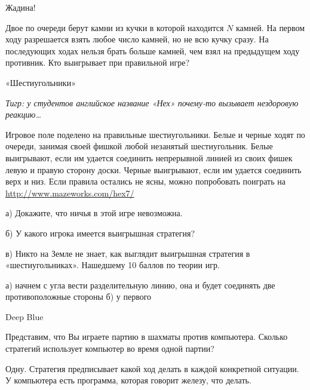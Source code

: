 \begin{problem}
 Жадина!\cite{zieve:tag} \par
Двое по очереди берут камни из кучки в которой находится  $N$  камней. На первом ходу разрешается взять любое число камней, но не всю кучку сразу. На последующих ходах нельзя брать больше камней, чем взял на предыдущем ходу противник. Кто выигрывает при правильной игре?\par



\begin{sol}

\end{sol}
\end{problem}



\begin{problem}
 «Шестиугольники»\par
{\it Тигр: у студентов английское название «Нех» почему-то вызывает нездоровую реакцию\ldots }\par
Игровое поле поделено на правильные шестиугольники. Белые и черные ходят по очереди, занимая своей фишкой любой незанятый шестиугольник. Белые выигрывают, если им удается соединить непрерывной линией из своих фишек левую и правую сторону доски. Черные выигрывают, если им удается соединить верх и низ. Если правила остались не ясны, можно попробовать поиграть на \url{http://www.mazeworks.com/hex7/}\par
а)	Докажите, что ничья в этой игре невозможна.\par
б)	У какого игрока имеется выигрышная стратегия?\par
в)	Никто на Земле не знает, как выглядит выигрышная стратегия в «шестиугольниках». Нашедшему 10 баллов по теории игр.\par




\begin{sol}
а) начнем с угла вести разделительную линию, она и будет соединять две противоположные стороны б) у первого
\end{sol}
\end{problem}



\begin{problem}
 Deep Blue\par
Представим, что Вы играете партию в шахматы против компьютера. Сколько стратегий использует компьютер во время одной партии?



\begin{sol}
Одну. Стратегия предписывает какой ход делать в каждой конкретной ситуации. У компьютера есть программа, которая говорит железу, что делать.
\end{sol}
\end{problem}




